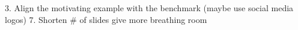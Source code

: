 3. Align the motivating example with the benchmark (maybe use social media logos)
7. Shorten # of slides give more breathing room